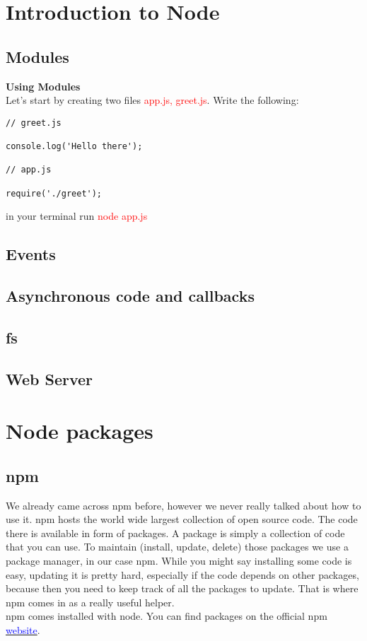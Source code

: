 \documentclass[a4paper]{article}
\begin{document}
\maketitle


\tableofcontents


\section{Introduction to Node}
\subsection{Modules}
\textbf{Using Modules}\\
Let's start by creating two files \textcolor{red}{app.js, greet.js}. Write the following:

\begin{lstlisting}
// greet.js

console.log('Hello there');

// app.js

require('./greet');
\end{lstlisting}

in your terminal run  \textcolor{red}{node app.js}

\subsection{Events}


\subsection{Asynchronous code and callbacks}

\subsection{fs}

\subsection{Web Server}

\section{Node packages}
\subsection{npm}
We already came across npm before, however we never really talked about how to use it. npm hosts the world wide largest collection of open source code. The code there is available in form of packages. A package is simply a collection of code that you can use. To maintain (install, update, delete) those packages we use a package manager, in our case npm. While you might say installing some code is easy, updating it is pretty hard, especially if the code depends on other packages, because then you need to keep track of all the packages to update. That is where npm comes in as a really useful helper.
\\
npm comes installed with node. You can find packages on the official npm \href{https://www.npmjs.com}{\textcolor{blue}{website}}.
\end{document}
